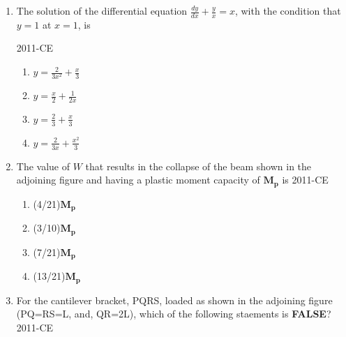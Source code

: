 \documentclass[journal,12pt,onecolumn]{IEEEtran}
\theoremstyle{remark}
\begin{document}
\begin{enumerate}
	\hfill{2011-CE}

	\begin{multicols}{4}
	\begin{enumerate}
		\item $a^{2}b^{2}-\brak{\vec{a} \cdot \vec{b}^2}^{2}$
		\item $ab-\vec{a} \cdot \vec{b}$
		\item $a^{2}b^{2}+\brak{\vec{a} \cdot \vec{b}^2}^{2}$
		\item $ab+\vec{a} \cdot \vec{b}$
	\end{enumerate}
	\end{multicols}

\item The solution of the differential equation $\frac{dy}{dx}+\frac{y}{x}=x$, with the condition that $y=1$ at $x=1$, is

	\hfill{2011-CE}

	\begin{multicols}{4}
	\begin{enumerate}
		\item $y=\frac{2}{3x^{2}}+\frac{x}{3}$
		\item $y=\frac{x}{2}+\frac{1}{2x}$
 		\item $y=\frac{2}{3}+\frac{x}{3}$
		\item $y=\frac{2}{3x}+\frac{x^{2}}{3}$
	\end{enumerate}
	\end{multicols}

\item The value of $W$ that results in the collapse of the beam shown in the adjoining figure and having a plastic moment capacity of $\mathbf{M_{p}}$ is
	\hfill{2011-CE}

\begin{figure}[ht]
\centering

\end{figure}


	\begin{multicols}{4}
	\begin{enumerate}
		\item (4/21)$\mathbf{M_{p}}$
		\item (3/10)$\mathbf{M_{p}}$
		\item (7/21)$\mathbf{M_{p}}$
		\item (13/21)$\mathbf{M_{p}}$
	\end{enumerate}
	\end{multicols}

\item For the cantilever bracket, PQRS, loaded as shown in the adjoining figure (PQ=RS=L, and, QR=2L), which of the following staements is \textbf{FALSE}?
	\hfill{2011-CE}


\end{enumerate}
\end{document}
